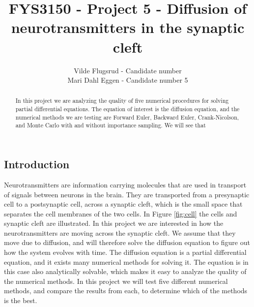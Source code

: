 \documentclass[12pt]{article}
\begin{document}
\title{FYS3150 - Project 5 - Diffusion of neurotransmitters in the synaptic cleft}
\author{Vilde Flugsrud - Candidate number
\\ Mari Dahl Eggen - Candidate number 5}

\maketitle

\newpage

\tableofcontents

\newpage

\begin{flushleft}
\begin{abstract}
In this project we are analyzing the quality of five numerical procedures for solving partial differential equations. The equation of interest is the diffusion equation, and the numerical methods we are testing are Forward Euler, Backward Euler, Crank-Nicolson, and Monte Carlo with and without importance sampling. We will see that
\end{abstract}

\section{Introduction}
Neurotransmitters are information carrying molecules that are used in transport of signals between neurons in the brain. They are transported from a presynaptic cell to a postsynaptic cell, across a synaptic cleft, which is the small space that separates the cell membranes of the two cells. In Figure \ref{fig:cell} the cells and synaptic cleft are illustrated. In this project we are interested in how the neurotransmitters are moving across the synaptic cleft. We assume that they move due to diffusion, and will therefore solve the diffusion equation to figure out how the system evolves with time. The diffusion equation is a partial differential equation, and it exists many numerical methods for solving it. The equation is in this case also analytically solvable, which makes it easy to analyze the quality of the numerical methods. In this project we will test five different numerical methods, and compare the results from each, to determine which of the methods is the best.  


\end{flushleft}
\end{document}
